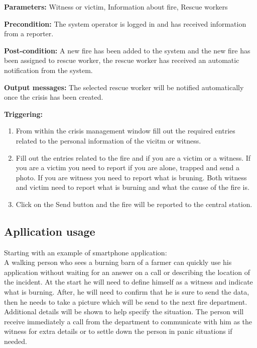 \begin{description}

\item \textbf{Parameters:} Witness or victim, Information about
fire, Rescue workers
\item \textbf{Precondition:} The system operator is logged in and has received information from a reporter.
\item \textbf{Post-condition:} A new fire has been added to the system and the
new fire has been assigned to rescue worker, the rescue worker has received an
automatic notification from the system.
\item \textbf{Output messages:} The selected rescue worker will be notified
automatically once the crisis has been created.

\item \textbf{Triggering:}
\begin{enumerate}
\item From within the crisis management window fill out the required entries
related to the personal information of the vicitm or witness.
\item Fill out the entries related to the fire and if you are a victim or a
witness. If you are a victim you need to report if you are alone, trapped and
send a photo. If you are witness you need to report what is bruning. Both
witness and victim need to report what is burning and what the cause of the
fire is.
\item Click on the Send button and the fire will be reported to the central
station.
\end{enumerate}

 
\end{description}

 
\subsection{Apllication usage}
Starting with an example of smartphone application:
\\[8pt]
A walking person who sees a burning barn of a farmer can quickly use his
application without waiting for an answer on a call or describing the location
of the incident. At the start he will need to define himself as a witness and
indicate what is burning. After, he will need to confirm that he is sure to
send the data, then he needs to take a picture which will be send to the next
fire department. Additional details will be shown to help specify the situation.
The person will receive immediately a call from the department to communicate
with him as the witness for extra details or to settle down the person in panic
situations if needed.

